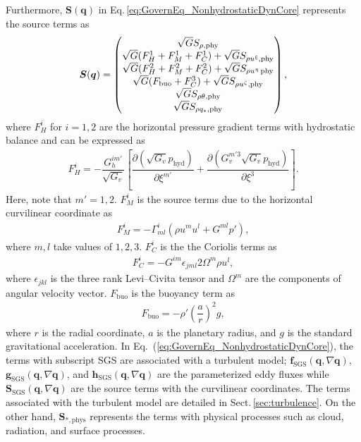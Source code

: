 Furthermore, 
$\bm{S}(\bm{q})$ in Eq.\,\eqref{eq:GovernEq_NonhydrostaticDynCore} represents the source terms as 
\begin{align}
\bm{S}(\bm{q})
=
  \begin{pmatrix}
    \sqrt{G} S_{\rho,{\rm phy}} \\
    \sqrt{G} ( F_H^1 + F_M^1 + F_C^1 ) + \sqrt{G} S_{\rho u^\xi,{\rm phy}} \\
    \sqrt{G} ( F_H^2 + F_M^2 + F_C^2 ) + \sqrt{G} S_{\rho u^\eta\,{\rm phy}} \\
    \sqrt{G} ( F_\textrm{buo} + F_C^3 ) + \sqrt{G} S_{\rho u^\zeta,{\rm phy}} \\
    \sqrt{G} S_{\rho \theta,{\rm phy}} \\
    \sqrt{G} S_{\rho q_*,{\rm phy}}
  \end{pmatrix},   
\end{align}
where 
$F_H^i$ for $i=1,2$ are the horizontal pressure gradient terms with hydrostatic balance 
and can be expressed as 
\begin{align}
  F_H^i= - \dfrac{G_h^{im'}}{\sqrt{G_v}} \left[ 
        \dfrac{\partial (\sqrt{G_v} p_\textrm{hyd})}{\partial \xi^{m'}} 
      + \dfrac{\partial (G_v^{m'3} \sqrt{G_v} p_\textrm{hyd})}{\partial \xi^3}
    \right]. 
\end{align}
Here, note that $m'=1,2$. 
$F_M^i$ is the source terms due to the horizontal curvilinear coordinate as 
\begin{align}
  F_M^i=-\Gamma^i_{ml} (\rho u^m u^l + G^{ml} p'), 
\end{align}
where $m,l$ take values of $1,2,3$.
$F_C^i$ is the the Coriolis terms as 
\begin{align}
  F_C^i=- G^{im} \epsilon_{jml} 2\Omega^m \rho u^l,
\end{align}
where $\epsilon_{jkl}$ is the three rank Levi--Civita tensor 
and $\Omega^m$ are the components of angular velocity vector. 
$F_\textrm{buo}$ is the buoyancy term as 
\begin{align}
 F_\textrm{buo}=- \rho' \left(\dfrac{a}{r}\right)^2 g,   
\end{align}
where $r$ is the radial coordinate, 
$a$ is the planetary radius, 
and $g$ is the standard gravitational acceleration. 
In Eq.~(\ref{eq:GovernEq_NonhydrostaticDynCore}), 
the terms with subscript SGS are associated with a turbulent model;  
$\bm{f}_\textrm{SGS}(\bm{q},\nabla\bm{q})$, $\bm{g}_\textrm{SGS}(\bm{q},\nabla\bm{q})$, 
and $\bm{h}_\textrm{SGS}(\bm{q},\nabla\bm{q})$ are the parameterized eddy fluxes 
while  
$\bm{S}_\textrm{SGS}(\bm{q},\nabla\bm{q})$ are the source terms with the curvilinear coordinates. 
The terms associated with the turbulent model are detailed in Sect.\,\ref{sec:turbulence}. 
On the other hand, 
$\bm{S}_{*,\textrm{phys}}$ represents the terms with physical processes 
such as cloud, radiation, and surface processes. 


